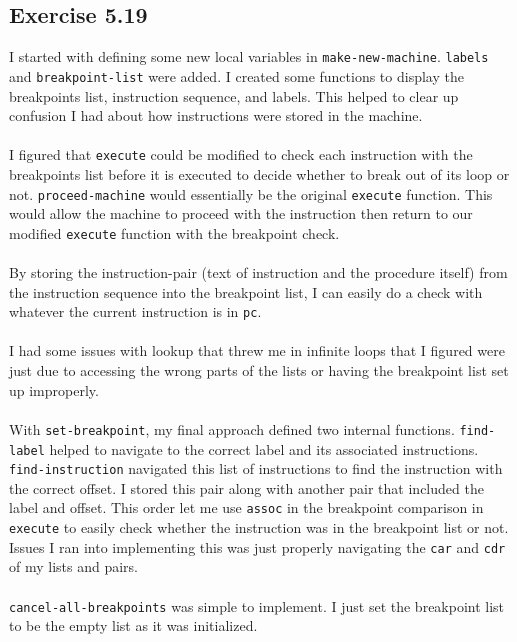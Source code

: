 \documentclass[a4paper,12pt]{article}
\begin{document}
\subsection{Exercise 5.19}
I started with defining some new local variables in \texttt{make-new-machine}. \texttt{labels} and \texttt{breakpoint-list} were added. I created some functions to display the breakpoints list, instruction sequence, and labels. This helped to clear up confusion I had about how instructions were stored in the machine.\\
\\
I figured that \texttt{execute} could be modified to check each instruction with the breakpoints list before it is executed to decide whether to break out of its loop or not. \texttt{proceed-machine} would essentially be the original \texttt{execute} function. This would allow the machine to proceed with the instruction then return to our modified \texttt{execute} function with the breakpoint check.\\
\\
By storing the instruction-pair (text of instruction and the procedure itself) from the instruction sequence into the breakpoint list, I can easily do a check with whatever the current instruction is in \texttt{pc}.\\
\\
\newpage
I had some issues with lookup that threw me in infinite loops that I figured were just due to accessing the wrong parts of the lists or having the breakpoint list set up improperly.\\
\\
With \texttt{set-breakpoint}, my final approach defined two internal functions. \texttt{find-label} helped to navigate to the correct label and its associated instructions. \texttt{find-instruction} navigated this list of instructions to find the instruction with the correct offset. I stored this pair along with another pair that included the label and offset. This order let me use \texttt{assoc} in the breakpoint comparison in \texttt{execute} to easily check whether the instruction was in the breakpoint list or not. Issues I ran into implementing this was just properly navigating the \texttt{car} and \texttt{cdr} of my lists and pairs.\\
\\
\texttt{cancel-all-breakpoints} was simple to implement. I just set the breakpoint list to be the empty list as it was initialized.\\
\\
\end{document}
